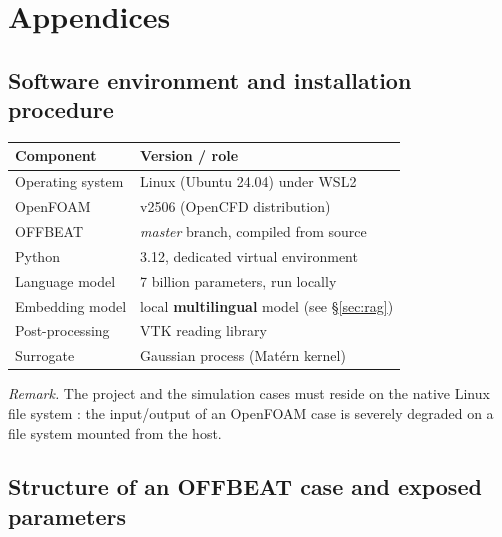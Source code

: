 \appendix
\chapter*{Appendices}

\renewcommand{\thesection}{Appendix \Alph{section}}
\setcounter{section}{0}

\section{Software environment and installation procedure}
\label{ann:install}

\noindent
\begin{tabularx}{\textwidth}{@{}lX@{}}
\toprule
\textbf{Component} & \textbf{Version / role}\\
\midrule
Operating system & Linux (Ubuntu 24.04) under WSL2\\
OpenFOAM & v2506 (OpenCFD distribution)\\
OFFBEAT & \textit{master} branch, compiled from source\\
Python & 3.12, dedicated virtual environment\\
Language model & \num{7} billion parameters, run locally\\
Embedding model & local \textbf{multilingual} model (see §\ref{sec:rag})\\
Post-processing & VTK reading library\\
Surrogate & Gaussian process (Matérn kernel)\\
\bottomrule
\end{tabularx}

\vspace{0.5cm}

\noindent
\textit{Remark.} The project and the simulation cases must reside on the native
Linux file system : the input/output of an OpenFOAM case is severely degraded on
a file system mounted from the host.

\section{Structure of an OFFBEAT case and exposed parameters}
\label{ann:cas}

